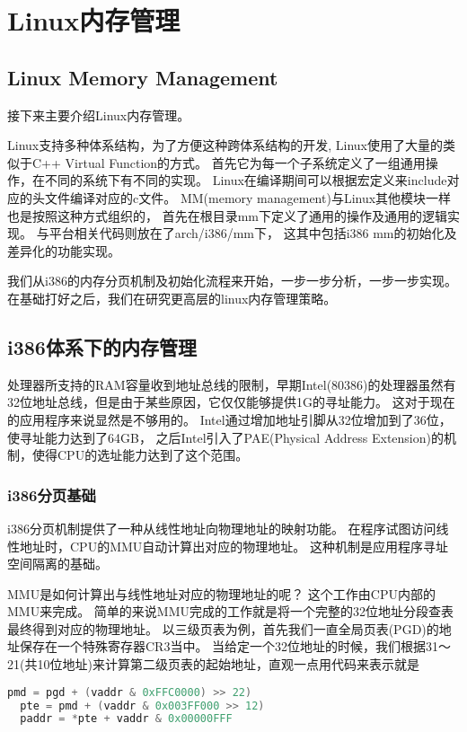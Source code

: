
\chapter{Linux内存管理}



\section{Linux Memory Management}
接下来主要介绍Linux内存管理。

Linux支持多种体系结构，为了方便这种跨体系结构的开发, Linux使用了大量的类似于C++ Virtual Function的方式。
首先它为每一个子系统定义了一组通用操作，在不同的系统下有不同的实现。
Linux在编译期间可以根据宏定义来include对应的头文件编译对应的c文件。
MM(memory management)与Linux其他模块一样也是按照这种方式组织的， 首先在根目录mm下定义了通用的操作及通用的逻辑实现。
与平台相关代码则放在了arch/i386/mm下， 这其中包括i386 mm的初始化及差异化的功能实现。

我们从i386的内存分页机制及初始化流程来开始，一步一步分析，一步一步实现。
在基础打好之后，我们在研究更高层的linux内存管理策略。


\section{i386体系下的内存管理}


处理器所支持的RAM容量收到地址总线的限制，早期Intel(80386)的处理器虽然有32位地址总线，但是由于某些原因，它仅仅能够提供1G的寻址能力。
这对于现在的应用程序来说显然是不够用的。
Intel通过增加地址引脚从32位增加到了36位，使寻址能力达到了64GB， 之后Intel引入了PAE(Physical Address Extension)的机制，使得CPU的选址能力达到了这个范围。

\subsection{i386分页基础}
i386分页机制提供了一种从线性地址向物理地址的映射功能。
在程序试图访问线性地址时，CPU的MMU自动计算出对应的物理地址。 
这种机制是应用程序寻址空间隔离的基础。

MMU是如何计算出与线性地址对应的物理地址的呢？ 这个工作由CPU内部的MMU来完成。
简单的来说MMU完成的工作就是将一个完整的32位地址分段查表最终得到对应的物理地址。
以三级页表为例，首先我们一直全局页表(PGD)的地址保存在一个特殊寄存器CR3当中。
当给定一个32位地址的时候，我们根据31～21(共10位地址)来计算第二级页表的起始地址，直观一点用代码来表示就是\begin{lstlisting}[language=C]
  pmd = pgd + (vaddr & 0xFFC0000) >> 22)
  pte = pmd + (vaddr & 0x003FF000 >> 12)
  paddr = *pte + vaddr & 0x00000FFF
\end{lstlisting}

